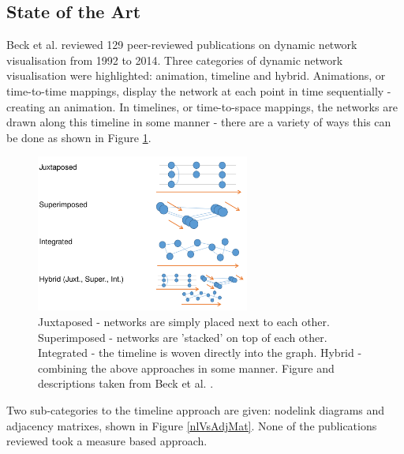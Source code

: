 \subsection{State of the Art}
Beck et al. \cite{tsotaivg} reviewed 129 peer-reviewed publications on dynamic network visualisation from 1992 to 2014.  Three categories of dynamic network visualisation were highlighted: animation, timeline and hybrid. Animations, or time-to-time mappings, display the network at each point in time sequentially - creating an animation. In timelines, or time-to-space mappings, the networks are drawn along this timeline in some manner - there are a variety of ways this can be done as shown in Figure \ref{timeLineApproaches}. 
\begin{figure}[H]
\begin{center}
\includegraphics[trim={0 0 0 0}, width=70mm]{./Figures/timeLineApproaches.png}
\caption{
Juxtaposed - networks are simply placed next to each other.\newline
Superimposed - networks are 'stacked' on top of each other.\newline
Integrated - the timeline is woven directly into the graph.\newline
Hybrid - combining the above approaches in some manner.\newline
Figure and descriptions taken from Beck et al. \cite{tsotaivg}.}
\label{timeLineApproaches}
\end{center}
\end{figure}
Two sub-categories to the timeline approach are given: nodelink diagrams and adjacency matrixes, shown in Figure \ref{nlVsAdjMat}. None of the publications reviewed took a measure based approach.


